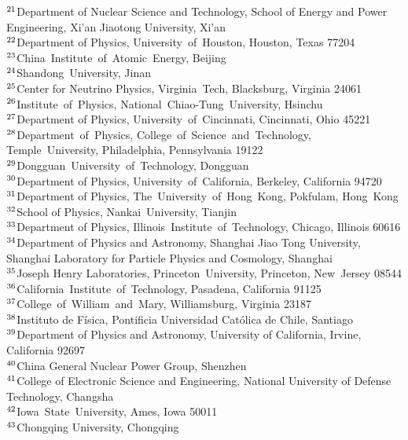 {$^{21}$Department of Nuclear Science and Technology, School of Energy and Power Engineering, Xi'an Jiaotong University, Xi'an \\ 
$^{22}$Department of Physics, University~of~Houston, Houston, Texas  77204 \\ 
$^{23}$China~Institute~of~Atomic~Energy, Beijing \\ 
$^{24}$Shandong~University, Jinan \\ 
$^{25}$Center for Neutrino Physics, Virginia~Tech, Blacksburg, Virginia  24061 \\ 
$^{26}$Institute~of~Physics, National~Chiao-Tung~University, Hsinchu \\ 
$^{27}$Department of Physics, University~of~Cincinnati, Cincinnati, Ohio 45221 \\ 
$^{28}$Department~of~Physics, College~of~Science~and~Technology, Temple~University, Philadelphia, Pennsylvania  19122 \\ 
$^{29}$Dongguan~University~of~Technology, Dongguan \\ 
$^{30}$Department of Physics, University~of~California, Berkeley, California  94720 \\ 
$^{31}$Department of Physics, The~University~of~Hong~Kong, Pokfulam, Hong~Kong \\ 
$^{32}$School of Physics, Nankai~University, Tianjin \\ 
$^{33}$Department of Physics, Illinois~Institute~of~Technology, Chicago, Illinois  60616 \\ 
$^{34}$Department of Physics and Astronomy, Shanghai Jiao Tong University, Shanghai Laboratory for Particle Physics and Cosmology, Shanghai \\ 
$^{35}$Joseph Henry Laboratories, Princeton~University, Princeton, New~Jersey 08544 \\ 
$^{36}$California~Institute~of~Technology, Pasadena, California 91125 \\ 
$^{37}$College~of~William~and~Mary, Williamsburg, Virginia  23187 \\ 
$^{38}$Instituto de F\'isica, Pontificia Universidad Cat\'olica de Chile, Santiago \\ 
$^{39}$Department of Physics and Astronomy, University of California, Irvine, California 92697 \\ 
$^{40}$China General Nuclear Power Group, Shenzhen \\ 
$^{41}$College of Electronic Science and Engineering, National University of Defense Technology, Changsha \\ 
$^{42}$Iowa~State~University, Ames, Iowa  50011 \\ 
$^{43}$Chongqing University, Chongqing \\ 
} 
